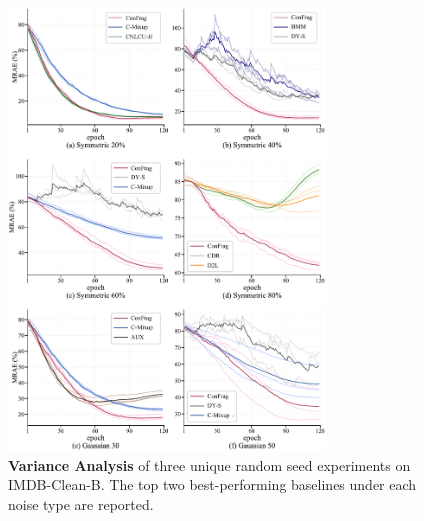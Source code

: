 \documentclass{article}
\theoremstyle{plain}
\theoremstyle{definition}
\theoremstyle{remark}
\begin{document}
\begin{figure}[th]
\begin{center}
\centerline{\includegraphics[width=0.75\textwidth]{imgs/variance_analysis_neurips.pdf}}
\caption{\textbf{Variance Analysis} of three unique random seed experiments on IMDB-Clean-B.  
The top two best-performing baselines under each noise type are reported.
}
\label{fig:variance_analysis}
\end{center}
\vskip -0.2in
\end{figure}

\clearpage
\end{document}
